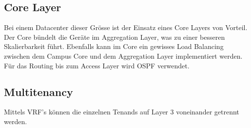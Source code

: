 \subsection{Core Layer}
Bei einem Datacenter dieser Grösse ist der Einsatz eines Core Layers von Vorteil. Der Core bündelt die Geräte im Aggregation Layer, was zu einer besseren Skalierbarkeit führt. Ebenfalls kann im Core ein gewisses Load Balancing zwischen dem Campus Core und dem Aggregation Layer implementiert werden. Für das Routing bis zum Access Layer wird OSPF verwendet.  


\subsection{Multitenancy}
Mittels VRF's können die einzelnen Tenands auf Layer 3 voneinander getrennt werden.



